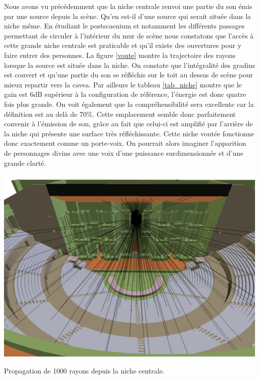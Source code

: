 Nous avons vu précédemment que la niche centrale renvoi une partie du son émis par une source depuis la scène. Qu'en est-il d'une source qui serait située dans la niche même. En étudiant le \gls{postscaenium} et notamment les différents passages permettant de circuler à l'intérieur du mur de scène nous constatons que l'accès à cette grande niche centrale est praticable et qu'il existe des ouvertures pour y faire entrer des personnes. La figure \ref{voute} montre la trajectoire des rayons lorsque la source est située dans la niche. On constate que l'intégralité des gradins est couvert et qu'une partie du son se réfléchis sur le toit au dessus de scène pour mieux repartir vers la \gls{cavea}. Par ailleurs le tableau \ref{tab_niche} montre que le gain est 6dB supérieur à la configuration de référence, l'énergie est donc quatre fois plus grande. On voit également que la compréhensibilité sera excellente car la définition est au delà de 70\%. Cette emplacement semble donc parfaitement convenir à l'émission de son, grâce au fait que celui-ci est amplifié par l'arrière de la niche qui présente une surface très réfléchissante. Cette niche voutée fonctionne donc exactement comme un porte-voix. On pourrait alors imaginer l'apparition de personnages divins avec une voix d'une puissance surdimensionnée et d'une grande clarté.
\begin{figureth}
	\includegraphics[width=0.8\linewidth]{images/voute}
	\caption{Propagation de 1000 rayons depuis la niche centrale.}
	\label{voute}
\end{figureth}

